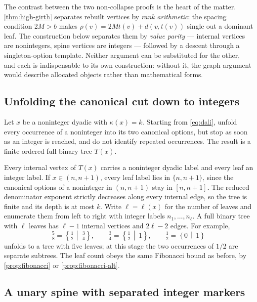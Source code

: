 \documentclass[11pt,a4paper]{article}
\numberwithin{equation}{section}
\theoremstyle{definition}
\theoremstyle{remark}
\newcommand{\rk}{\rho}
\newcommand{\cut}[2]{\left\{#1\,\middle|\,#2\right\}}
\begin{document}
The contrast between the two non-collapse proofs is the heart of the matter.
\cref{thm:high-girth} separates rebuilt vertices by \emph{rank arithmetic}: the
spacing condition $2M>b$ makes $\rk(v)=2Mt(v)+d(v,t(v))$ single out a dominant
leaf. The construction below separates them by \emph{value parity} --- internal
vertices are nonintegers, spine vertices are integers --- followed by a descent
through a singleton-option template. Neither argument can be substituted for the
other, and each is indispensable to its own construction: without it, the graph
argument would describe allocated objects rather than mathematical forms.

\subsection{Unfolding the canonical cut down to integers}

Let $x$ be a noninteger dyadic with $\kappa(x)=k$. Starting from
\eqref{eq:dali}, unfold every occurrence of a noninteger into its two canonical
options, but stop as soon as an integer is reached, and do not identify repeated
occurrences. The result is a finite ordered full binary tree $T(x)$.

Every internal vertex of $T(x)$ carries a noninteger dyadic label and every leaf
an integer label. If $x\in(n,n+1)$, every leaf label lies in $\{n,n+1\}$, since
the canonical options of a noninteger in $(n,n+1)$ stay in $[n,n+1]$. The
reduced denominator exponent strictly decreases along every internal edge, so
the tree is finite and its depth is at most $k$. Write $\ell=\ell(x)$ for the
number of leaves and enumerate them from left to right with integer labels
$n_1,\ldots,n_\ell$. A full binary tree with $\ell$ leaves has $\ell-1$ internal
vertices and $2\ell-2$ edges. For example,
\begin{equation}
 \tfrac58=\cut{\tfrac12}{\tfrac34},\qquad
 \tfrac34=\cut{\tfrac12}{1},\qquad
 \tfrac12=\cut{0}{1}
\end{equation}
unfolds to a tree with five leaves; at this stage the two occurrences of $1/2$
are separate subtrees. The leaf count obeys the same Fibonacci bound as before,
by \cref{prop:fibonacci} or \cref{prop:fibonacci-alt}.

\subsection{A unary spine with separated integer markers}
\end{document}
